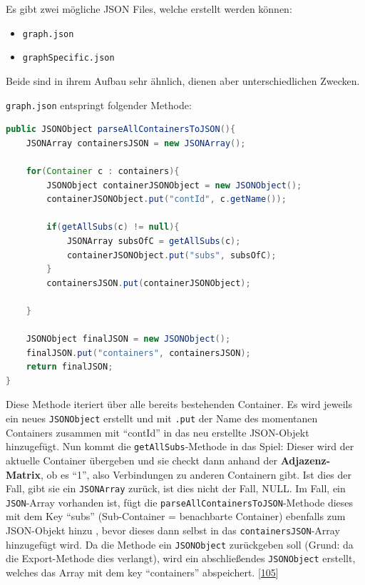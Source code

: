 \documentclass[
    headings=optiontotocandhead,%
    twoside,
    numbers=noenddot,%
    12pt, %
    titlepage, %
    parskip=full, %
    listof=leveldown, 
    numbers=noenddot, %
    a4paper,DIV=14,
    BCOR=15mm,
]{scrbook}
\newcommand{\passthrough}[1]{#1}
\providecommand{\tightlist}{%
  \setlength{\itemsep}{0pt}\setlength{\parskip}{0pt}}
\begin{document}
Es gibt zwei mögliche JSON Files, welche erstellt werden können:

\begin{itemize}
\tightlist
\item
  \passthrough{\lstinline!graph.json!}
\item
  \passthrough{\lstinline!graphSpecific.json!}
\end{itemize}

Beide sind in ihrem Aufbau sehr ähnlich, dienen aber unterschiedlichen
Zwecken.

\passthrough{\lstinline!graph.json!} entspringt folgender Methode:

\begin{lstlisting}[language=Java, caption={parseAllContainers Methode}]
public JSONObject parseAllContainersToJSON(){
    JSONArray containersJSON = new JSONArray();
  
    for(Container c : containers){
        JSONObject containerJSONObject = new JSONObject();
        containerJSONObject.put("contId", c.getName());
  
        if(getAllSubs(c) != null){
            JSONArray subsOfC = getAllSubs(c);
            containerJSONObject.put("subs", subsOfC);
        }  
        containersJSON.put(containerJSONObject);
  
    }
  
    JSONObject finalJSON = new JSONObject();
    finalJSON.put("containers", containersJSON);
    return finalJSON;
}
\end{lstlisting}

Diese Methode iteriert über alle bereits bestehenden Container. Es wird
jeweils ein neues \passthrough{\lstinline!JSONObject!} erstellt und mit
\passthrough{\lstinline!.put!} der Name des momentanen Containers
zusammen mit ``contId'' in das neu erstellte JSON-Objekt hinzugefügt.
Nun kommt die \passthrough{\lstinline!getAllSubs!}-Methode in das Spiel:
Dieser wird der aktuelle Container übergeben und sie checkt dann anhand
der \textbf{Adjazenz-Matrix}, ob es ``1'', also Verbindungen zu anderen
Containern gibt. Ist dies der Fall, gibt sie ein
\passthrough{\lstinline!JSONArray!} zurück, ist dies nicht der Fall,
NULL. Im Fall, ein \passthrough{\lstinline!JSON!}-Array vorhanden ist,
fügt die \passthrough{\lstinline!parseAllContainersToJSON!}-Methode
dieses mit dem Key ``subs'' (Sub-Container = benachbarte Container)
ebenfalls zum JSON-Objekt hinzu , bevor dieses dann selbst in das
\passthrough{\lstinline!containersJSON!}-Array hinzugefügt wird. Da die
Methode ein \passthrough{\lstinline!JSONObject!} zurückgeben soll
(Grund: da die Export-Methode dies verlangt), wird ein abschließendes
\passthrough{\lstinline!JSONObject!} erstellt, welches das Array mit dem
key ``containers'' abspeichert.
{[}\protect\hyperlink{ref-HowToDoInJava-JSON}{105}{]}
\end{document}

